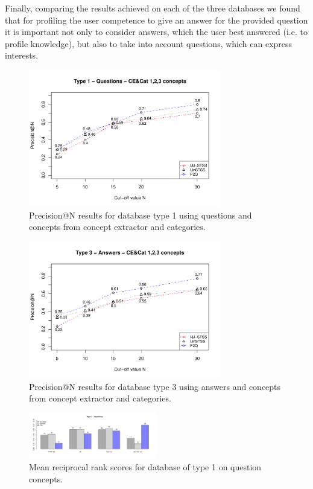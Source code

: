 \documentclass[conference]{IEEEtran}
\begin{document}
Finally, comparing the results achieved on each of the three databases we found that for profiling the user competence to give an answer for the provided question it is important not only to consider answers, which the user best answered (i.e. to profile knowledge), but also to take into account  questions, which can express interests.	
\begin{figure}[!t]
	\setlength{\belowcaptionskip}{-15pt}
	\setlength{\abovecaptionskip}{-5pt}
	\centering
	\includegraphics[width=3.3in]{type1questions_PAtN.pdf}
	\caption{Precision@N results for database type 1 using questions and concepts from concept extractor and categories.}
	\label{fig:pntype1}
\end{figure}
\begin{figure}[!t]
	\setlength{\belowcaptionskip}{-15pt}
	\setlength{\abovecaptionskip}{-5pt}
	\centering
	\includegraphics[width=3.3in]{type3answers_PAtN.pdf}
	\caption{Precision@N results for database type 3 using answers and concepts from concept extractor and categories.}
	\label{fig:pntype3}
\end{figure}
\begin{figure}[!t]
	\setlength{\belowcaptionskip}{-15pt}
	\setlength{\abovecaptionskip}{-10pt}
	\centering
	\includegraphics[width=0.5\textwidth]{mrrType1Questions.pdf}
	\caption{Mean reciprocal rank scores for database of type 1 on question concepts.}
	\label{fig:mrrtype1}
\end{figure}
\end{document}
